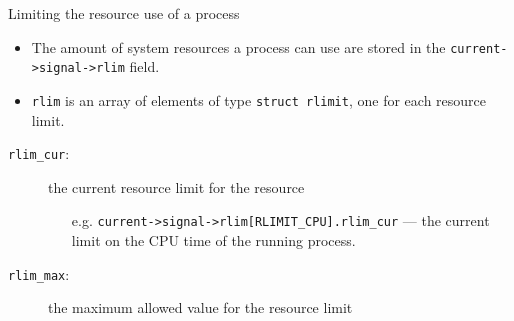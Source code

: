 \begin{frame}
  \begin{block}{Limiting the resource use of a process}
    \begin{itemize}
    \item The amount of system resources a process can use are stored in the
      \texttt{current->signal->rlim} field.
    \item \texttt{rlim} is an array of elements of type \texttt{struct rlimit}, one for each
      resource limit.
    \end{itemize}
  \end{block}
  \begin{center}
  \end{center}
  \begin{description}
  \item[\texttt{rlim\_cur}:] the current resource limit for the resource
    \begin{itemize}
    \item[e.g.] \texttt{current->signal->rlim[RLIMIT\_CPU].rlim\_cur} --- the
      current limit on the CPU time of the running process.
    \end{itemize}
  \item[\texttt{rlim\_max}:] the maximum allowed value for the resource limit
  \end{description}
\end{frame}

